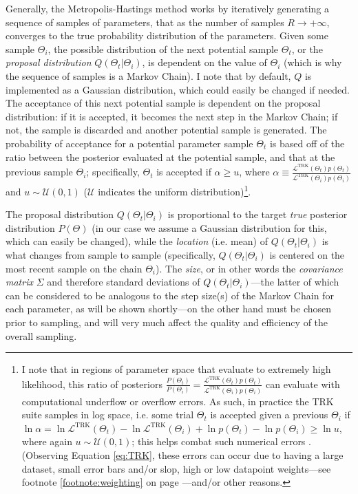 Generally, the Metropolis-Hastings method works by iteratively generating a sequence of samples of parameters, that as the number of samples $R\rightarrow+\infty$, converges to the true probability distribution of the parameters. Given some sample $\Theta_i$, the possible distribution of the next potential sample $\Theta_t$, or the \textit{proposal distribution} $Q(\Theta_t|\Theta_i)$, is dependent on the value of $\Theta_i$ (which is why the sequence of samples is a Markov Chain). I note that by default, $Q$ is implemented as a Gaussian distribution, which could easily be changed if needed. The acceptance of this next potential sample is dependent on the proposal distribution: if it is accepted, it becomes the next step in the Markov Chain; if not, the sample is discarded and another potential sample is generated. The probability of acceptance for a potential parameter sample $\Theta_t$ is based off of the ratio between the posterior evaluated at the potential sample, and that at the previous sample $\Theta_i$; specifically, $\Theta_t$ is accepted if $\alpha \geq u$, where $\displaystyle\alpha\equiv \frac{\mathcal{L}^\text{TRK}(\Theta_t)p(\Theta_t)}{\mathcal{L}^\text{TRK}(\Theta_i)p(\Theta_i)}$ and $u\sim\mathcal{U}(0,1)$ ($\mathcal{U}$ indicates the uniform distribution)\footnote{\label{footnote:logpost}I note that in regions of parameter space that evaluate to extremely high likelihood, this ratio of posteriors $\displaystyle\frac{P(\Theta_t)}{P(\Theta_i)} = \frac{\mathcal{L}^\text{TRK}(\Theta_t)p(\Theta_t)}{\mathcal{L}^\text{TRK}(\Theta_i)p(\Theta_i)}$ can evaluate with computational underflow or overflow errors. As such, in practice the TRK suite samples in log space, i.e. some trial $\Theta_t$ is accepted given a previous $\Theta_i$ if $\ln\alpha=\ln\mathcal{L}^\text{TRK}(\Theta_t) - \ln\mathcal{L}^\text{TRK}(\Theta_i) + \ln p(\Theta_t) - \ln p(\Theta_i)\geq \ln u$, where again $u\sim\mathcal{U}(0,1)$; this helps combat such numerical errors \textcite{stackoverflowlogpostsoln}. (Observing Equation \eqref{eq:TRK}, these errors can occur due to having a large dataset, small error bars and/or slop, high or low datapoint weights---see footnote \ref{footnote:weighting} on page \pageref{footnote:weighting}---and/or other reasons.}.

The proposal distribution $Q(\Theta_t|\Theta_i)$ is proportional to the target \textit{true} posterior distribution $P(\Theta)$ (in our case we assume a Gaussian distribution for this, which can easily be changed), while the \textit{location} (i.e. mean) of $Q(\Theta_t|\Theta_i)$ is what changes from sample to sample (specifically, $Q(\Theta_t|\Theta_i)$ is centered on the most recent sample on the chain $\Theta_i$). The \textit{size}, or in other words the \textit{covariance matrix} $\Sigma$ and therefore standard deviations of $Q(\Theta_t|\Theta_i)$---the latter of which can be considered to be analogous to the step size(s) of the Markov Chain for each parameter, as will be shown shortly---on the other hand must be chosen prior to sampling, and will very much affect the quality and efficiency of the overall sampling. 

